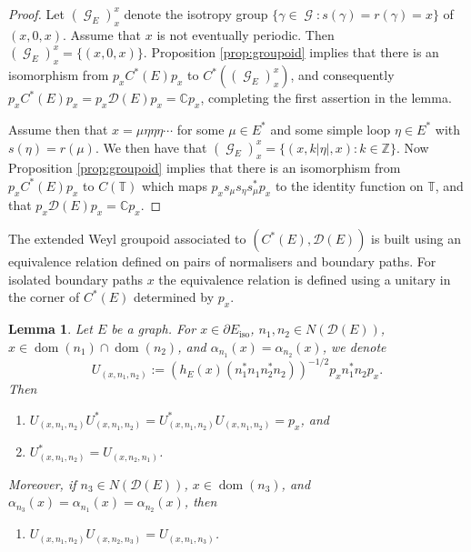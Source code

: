 \documentclass[12pt, a4paper]{amsart}
\numberwithin{equation}{section}
\newtheorem{lemma}[thm]{Lemma}
\theoremstyle{definition}
\theoremstyle{remark}
\begin{document}
\begin{proof}
	Let $({\operatorname{\mathcal{G}}}_E)_x^x$ denote the isotropy group 
	$\{\gamma\in{\operatorname{\mathcal{G}}}:s(\gamma)=r(\gamma)=x\}$ of $(x,0,x)$. Assume that $x$ is 
	not eventually periodic. Then $({\operatorname{\mathcal{G}}}_E)_x^x=\{(x,0,x)\}$. Proposition 
	\ref{prop:groupoid} implies that there is an isomorphism from 
	$p_xC^*(E)p_x$ to $C^*(({\operatorname{\mathcal{G}}}_E)_x^x)$, and consequently  
	$p_xC^*(E)p_x=p_x\mathcal{D}(E)p_x={\mathbb{C}} p_x$, completing the first assertion 
	in the lemma.
	
	Assume then that $x=\mu\eta\eta\eta\cdots$ for some $\mu\in E^*$ and some 
	simple loop $\eta\in E^*$ with $s(\eta)=r(\mu)$. We then have that 
	$({\operatorname{\mathcal{G}}}_E)_x^x=\{(x,k|\eta|,x):k\in{\mathbb{Z}}\}$. Now Proposition 
	\ref{prop:groupoid} implies that there is an isomorphism from $p_xC^*(E)p_x$ to 
	$C({\mathbb{T}})$ which maps $p_xs_\mu s_\eta s_\mu^*p_x$ to the identity function 
	on ${\mathbb{T}}$, and that $p_x\mathcal{D}(E)p_x={\mathbb{C}} p_x$.
\end{proof}

The extended Weyl groupoid associated to $(C^*(E),{\mathcal{D}}(E))$ is built using an 
equivalence relation defined on pairs of normalisers and boundary paths. For 
isolated boundary paths $x$ the equivalence relation is defined using a 
unitary in the corner of $C^*(E)$ determined by $p_x$.  

\begin{lemma}\label{lem: props of the unitary}
Let $E$ be a graph. For $x\in\partial 
E_{{\operatorname{iso}}}$, $n_1,n_2\in N(\mathcal{D}(E))$, $x\in{{\operatorname{dom}}}(n_1)\cap{{\operatorname{dom}}}(n_2)$, and 
$\alpha_{n_1}(x)=\alpha_{n_2}(x)$, we denote
\[
U_{(x,n_1,n_2)}:=(h_E(x)(n_1^*n_1n_2^*n_2))^{-1/2}p_xn_1^*n_2p_x.
\]
Then
\begin{enumerate}
\item[(1)] 
$U_{(x,n_1,n_2)}U_{(x,n_1,n_2)}^*=U_{(x,n_1,n_2)}^*U_{(x,n_1,n_2)}=p_x$, and
\item[(2)] $U_{(x,n_1,n_2)}^*=U_{(x,n_2,n_1)}$.
\end{enumerate}
Moreover, if $n_3\in N(\mathcal{D}(E))$, $x\in{{\operatorname{dom}}}(n_3)$, and 
$\alpha_{n_3}(x)=\alpha_{n_1}(x)=\alpha_{n_2}(x)$, then
\begin{enumerate}  
\item[(3)] $U_{(x,n_1,n_2)}U_{(x,n_2,n_3)}=U_{(x,n_1,n_3)}$. 
\end{enumerate}
\end{lemma}
\end{document}

